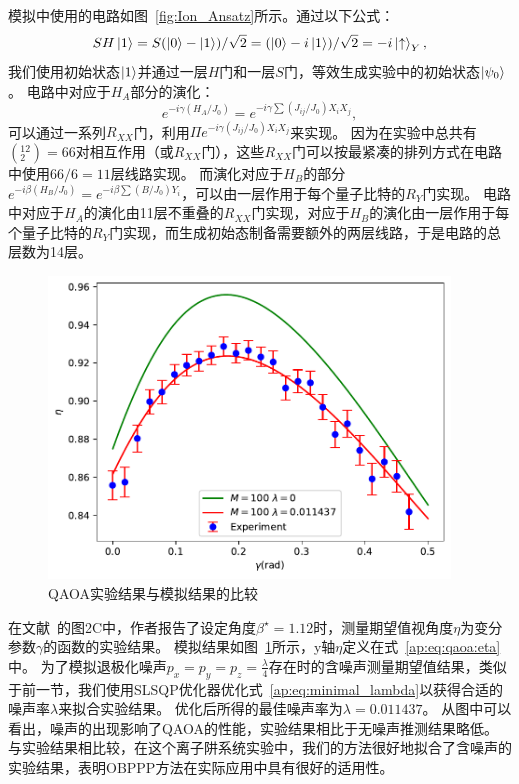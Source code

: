     模拟中使用的电路如图~\ref{fig:Ion_Ansatz}所示。通过以下公式：
    \begin{equation}
        SH\ket{1}=S(\ket{0}-\ket{1})/\sqrt{2}=(\ket{0}-i\ket{1})/\sqrt{2}=-i\ket{\uparrow}_Y,
    \end{equation}
    我们使用初始状态$\ket{1}$并通过一层$H$门和一层$S$门，等效生成实验中的初始状态$\ket{\psi_0}$。
    电路中对应于$H_A$部分的演化：
    \begin{equation}
        e^{-i\gamma (H_A/J_0)}=e^{-i\gamma \sum (J_{ij}/J_0)X_iX_j},
    \end{equation}
    可以通过一系列$R_{XX}$门，利用$\Pi e^{-i\gamma(J_{ij}/J_0)X_iX_j}$来实现。
    因为在实验中总共有$(^{12}_2)=66$对相互作用（或$R_{XX}$门），这些$R_{XX}$门可以按最紧凑的排列方式在电路中使用$66/6=11$层线路实现。
    而演化对应于$H_B$的部分$e^{-i\beta (H_B/J_0)}=e^{-i\beta \sum(B/J_0)Y_i}$，可以由一层作用于每个量子比特的$R_Y$门实现。
    电路中对应于$H_A$的演化由11层不重叠的$R_{XX}$门实现，对应于$H_B$的演化由一层作用于每个量子比特的$R_Y$门实现，而生成初始态制备需要额外的两层线路，于是电路的总层数为14层。
    
    \begin{figure}[htbp]
        \centering
        \includegraphics[width=0.95\textwidth]{figures/QAOA.pdf}
        \caption{QAOA实验结果与模拟结果的比较}\label{fig:QAOA_result}
    \end{figure}
    
    在文献~\cite{pagano2020quantum}的图2C中，作者报告了设定角度$\beta^\star=1.12$时，测量期望值视角度$\eta$为变分参数$\gamma$的函数的实验结果。
    模拟结果如图~\ref{fig:QAOA_result}所示，y轴$\eta$定义在式~\ref{ap:eq:qaoa:eta}中。
    为了模拟退极化噪声$p_x = p_y = p_z = \frac{\lambda}{4}$存在时的含噪声测量期望值结果，类似于前一节，我们使用SLSQP优化器优化式~\ref{ap:eq:minimal_lambda}以获得合适的噪声率$\lambda$来拟合实验结果。
    优化后所得的最佳噪声率为$\lambda=0.011437$。
    从图中可以看出，噪声的出现影响了QAOA的性能，实验结果相比于无噪声推测结果略低。
    与实验结果相比较，在这个离子阱系统实验中，我们的方法很好地拟合了含噪声的实验结果，表明OBPPP方法在实际应用中具有很好的适用性。



